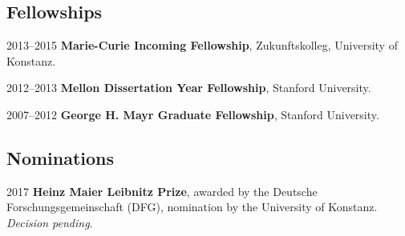 \subsection*{Fellowships}
\begin{dated}
	\item[2013--2015]
		\textbf{Marie-Curie Incoming Fellowship}, Zukunftskolleg, University of Konstanz.
	\item[2012--2013]
		\textbf{Mellon Dissertation Year Fellowship}, Stanford University.
	\item[2007--2012]
		\textbf{George H. Mayr Graduate Fellowship}, Stanford University.
\end{dated}
\subsection*{Nominations}
\begin{dated}
	\item[2017]
		\textbf{Heinz Maier Leibnitz Prize}, awarded by the Deutsche Forschungsgemeinschaft (DFG), nomination by the University of Konstanz.
		\textit{Decision pending}.
\end{dated}